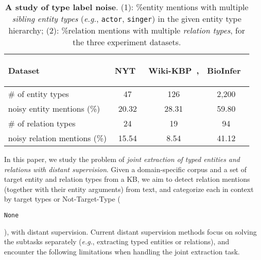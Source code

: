 \documentclass[letterpaper]{sig-alternate-2013}
\def\eg{{\sl e.g.}}
\begin{document}
\begin{table}[t]
\begin{small}
\begin{center}
\hspace*{-0.3cm}
\begin{tabularx}{1.03\linewidth}{l|ccc}
\hline
\begin{scriptsize}
\textbf{Dataset}\end{scriptsize} & \begin{scriptsize}
\textbf{NYT}~\cite{riedel2010modeling}\end{scriptsize}  & \begin{scriptsize}\textbf{Wiki-KBP}~\cite{ellislinguistic},\end{scriptsize} & \begin{scriptsize}\textbf{BioInfer}~\cite{pyysalo2007bioinfer}\end{scriptsize}\\ \hline
\# of entity types & 47 & 126 & 2,200 \\
noisy entity mentions (\%) & 20.32 & 28.31 & 59.80 \\
\hline
\# of relation types & 24 & 19 & 94 \\
noisy relation mentions (\%) & 15.54 & 8.54 & 41.12 \\
\hline
\end{tabularx}
\caption{\textbf{A study of type label noise}. \scriptsize (1): \%entity mentions with multiple \textit{sibling entity types} (\eg, \texttt{\scriptsize actor}, \texttt{\scriptsize singer}) in the given entity type hierarchy; (2): \%relation mentions with multiple \textit{relation types}, for the three experiment datasets.}
\label{table:label_noise_stats}
\vspace{-0.3cm}
\end{center}
\end{small}
\end{table}




In this paper, we study the problem of \textit{joint extraction of typed entities and relations with distant supervision}. Given a domain-specific corpus and a set of target entity and relation types from a KB, we aim to detect relation mentions (together with their entity arguments) from text, and categorize each in context by target types or Not-Target-Type (\begin{small}\texttt{None}\end{small}), with distant supervision. 
Current distant supervision methods focus on solving the subtasks separately (\eg, extracting typed entities or relations), and encounter the following limitations when handling the joint extraction task.
\end{document}
